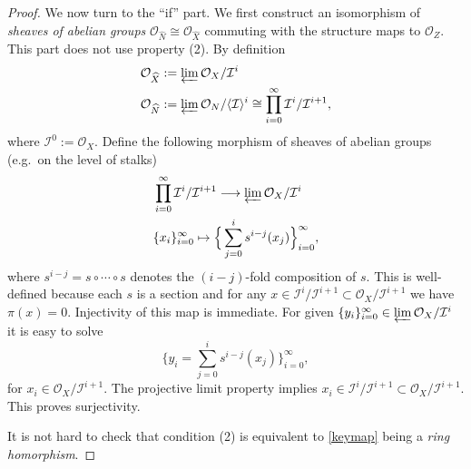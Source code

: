 \documentclass[12pt]{amsart}
\theoremstyle{definition}
\theoremstyle{property}
\newcommand\I{\mathcal I}
\renewcommand\O{\mathcal O}
\renewcommand\_{^{}_}
\begin{document}
\begin{proof}
We now turn to the ``if'' part. We first construct an isomorphism of \emph{sheaves of abelian groups} $\O_{\widehat{N}} \cong \O_{\widehat{X}}$ commuting with the structure maps to $\O_Z$. This part does not use property (2). By definition 
\begin{align*}
\O_{\widehat{X}} &:= \varprojlim \O_X / \I^i \\ 
\O_{\widehat{N}} &:=\varprojlim \O_{N} / \langle \I \rangle^i \cong \prod_{i=0}^{\infty} \I^i / \I^{i+1},
\end{align*}
where $\I^0 := \O_X$. Define the following morphism of sheaves of abelian groups (e.g.~on the level of stalks)
\begin{align}
\begin{split} \label{keymap}
&\prod_{i=0}^{\infty} \I^i / \I^{i+1} \longrightarrow \varprojlim \O_X / \I^i \\
&\{x_i\}_{i=0}^{\infty} \mapsto \Big\{ \sum_{j=0}^{i} s^{i-j}(x_j) \Big\}_{i=0}^{\infty},
\end{split}
\end{align}
where $s^{i-j} = s \circ \cdots \circ s$ denotes the $(i-j)$-fold composition of $s$. This is well-defined because each $s$ is a section and for any $x \in \I^i / \I^{i+1} \subset \O_X / \I^{i+1}$ we have $\pi(x) = 0$. Injectivity of this map is immediate. For given $\{y_i\}_{i=0}^{\infty} \in \varprojlim \O_X / \I^i$ it is easy to solve
$$
\Big\{y_i = \sum_{j=0}^{i} s^{i-j}(x_j) \Big\}_{i=0}^{\infty},
$$
for $x_i \in \O_X / \I^{i+1}$. The projective limit property implies $x_i \in \I^i / \I^{i+1} \subset \O_X / \I^{i+1}$. This proves surjectivity.

It is not hard to check that condition (2) is equivalent to \eqref{keymap} being a \emph{ring homorphism}. 
\end{proof}
\end{document}
